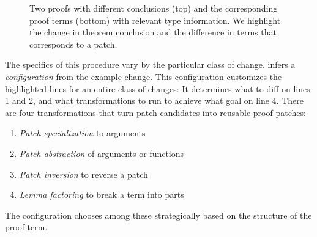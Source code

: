 \begin{figure*}
\begin{minipage}{0.50\textwidth}
\lstset{language=coq, aboveskip=0pt, belowskip=0pt}






\end{minipage}
\hfill
\begin{minipage}{0.48\textwidth}
\lstset{language=coq, aboveskip=0pt, belowskip=0pt}






\end{minipage}
\caption{Two proofs with different conclusions (top) and the
corresponding proof terms (bottom) with relevant type information. We highlight the change in theorem conclusion and
the difference in terms that corresponds to a patch.}
\label{fig:example}
\end{figure*}

The specifics of this procedure vary by the particular class of change.
\sysname infers a \textit{configuration} from the example change.
This configuration customizes the highlighted lines for an entire class of changes:
It determines what to diff on lines 1 and 2,
and what transformations to run to achieve what goal on line 4.
There are four transformations that turn patch candidates into reusable proof patches:

\begin{enumerate}
\item \textit{Patch specialization} to arguments
\item \textit{Patch abstraction} of arguments or functions
\item \textit{Patch inversion} to reverse a patch
\item \textit{Lemma factoring} to break a term into parts
\end{enumerate}
The configuration chooses among these strategically based on the structure of the proof term.

